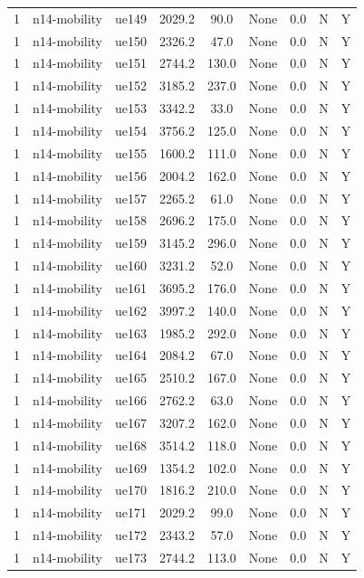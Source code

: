 \begin{table}[ht]
\begin{tabular}{|c|c|c|c|c|c|c|c|c|}
1 & n14-mobility & ue149 & 2029.2 & 90.0 & None & 0.0 & N & Y \\
1 & n14-mobility & ue150 & 2326.2 & 47.0 & None & 0.0 & N & Y \\
1 & n14-mobility & ue151 & 2744.2 & 130.0 & None & 0.0 & N & Y \\
1 & n14-mobility & ue152 & 3185.2 & 237.0 & None & 0.0 & N & Y \\
1 & n14-mobility & ue153 & 3342.2 & 33.0 & None & 0.0 & N & Y \\
1 & n14-mobility & ue154 & 3756.2 & 125.0 & None & 0.0 & N & Y \\
1 & n14-mobility & ue155 & 1600.2 & 111.0 & None & 0.0 & N & Y \\
1 & n14-mobility & ue156 & 2004.2 & 162.0 & None & 0.0 & N & Y \\
1 & n14-mobility & ue157 & 2265.2 & 61.0 & None & 0.0 & N & Y \\
1 & n14-mobility & ue158 & 2696.2 & 175.0 & None & 0.0 & N & Y \\
1 & n14-mobility & ue159 & 3145.2 & 296.0 & None & 0.0 & N & Y \\
1 & n14-mobility & ue160 & 3231.2 & 52.0 & None & 0.0 & N & Y \\
1 & n14-mobility & ue161 & 3695.2 & 176.0 & None & 0.0 & N & Y \\
1 & n14-mobility & ue162 & 3997.2 & 140.0 & None & 0.0 & N & Y \\
1 & n14-mobility & ue163 & 1985.2 & 292.0 & None & 0.0 & N & Y \\
1 & n14-mobility & ue164 & 2084.2 & 67.0 & None & 0.0 & N & Y \\
1 & n14-mobility & ue165 & 2510.2 & 167.0 & None & 0.0 & N & Y \\
1 & n14-mobility & ue166 & 2762.2 & 63.0 & None & 0.0 & N & Y \\
1 & n14-mobility & ue167 & 3207.2 & 162.0 & None & 0.0 & N & Y \\
1 & n14-mobility & ue168 & 3514.2 & 118.0 & None & 0.0 & N & Y \\
1 & n14-mobility & ue169 & 1354.2 & 102.0 & None & 0.0 & N & Y \\
1 & n14-mobility & ue170 & 1816.2 & 210.0 & None & 0.0 & N & Y \\
1 & n14-mobility & ue171 & 2029.2 & 99.0 & None & 0.0 & N & Y \\
1 & n14-mobility & ue172 & 2343.2 & 57.0 & None & 0.0 & N & Y \\
1 & n14-mobility & ue173 & 2744.2 & 113.0 & None & 0.0 & N & Y \\

\end{tabular}
\end{table}
